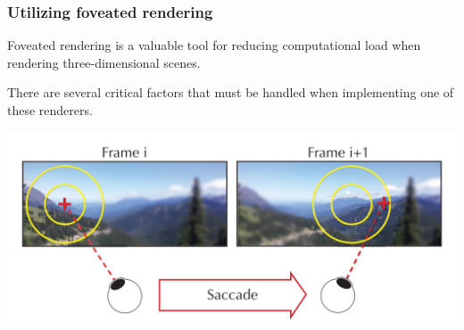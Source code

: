 \documentclass{beamer}
\newcommand{\linespace}{\vskip 0.25cm}
\begin{document}
\begin{frame}
  \frametitle{Utilizing foveated rendering}
  
Foveated rendering is a valuable tool for reducing computational load when rendering three-dimensional scenes.

\linespace

There are several critical factors that must be handled when implementing one of these renderers.


  \begin{center}
    \includegraphics[width=.95\textwidth]{Illustrations/saccade.png}
    \\
  \end{center}
  
\end{frame}
\end{document}
